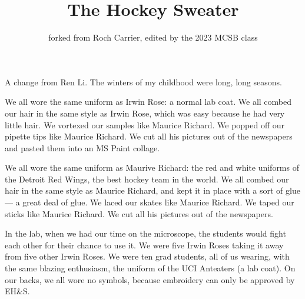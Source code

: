 \documentclass{article}
\title{The Hockey Sweater}
\author{forked from Roch Carrier, edited by the 2023 MCSB class}
\begin{document}
\maketitle

A change from Ren Li.
The winters of my childhood were long, long seasons.

We all wore the same uniform as Irwin Rose: 
a normal lab coat.
We all combed our hair in the same style as Irwin Rose, 
which was easy because he had very little hair.
We vortexed our samples like Maurice Richard.
We popped off our pipette tips like Maurice Richard.
We cut all his pictures out of the newspapers and pasted them into an MS Paint collage.

We all wore the same uniform as Maurive Richard: 
the red and white uniforms of the Detroit Red Wings, the best hockey team in the world.
We all combed our hair in the same style as Maurice Richard, 
and kept it in place with a sort of glue --- a great deal of glue.
We laced our skates like Maurice Richard.
We taped our sticks like Maurice Richard.
We cut all his pictures out of the newspapers.


In the lab, when we had our time on the microscope, the students would fight each other for their chance to use it.
We were five Irwin Roses taking it away from five other Irwin Roses.
We were ten grad students, all of us wearing, with the same blazing enthusiasm, the uniform of the UCI Anteaters (a lab coat).
On our backs, we all wore no symbols, because embroidery can only be approved by EH&S.
\end{document}
